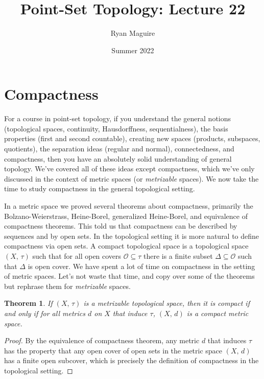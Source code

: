 \documentclass{article}
\title{Point-Set Topology: Lecture 22}
\author{Ryan Maguire}
\date{Summer 2022}
\theoremstyle{plain}
\newtheorem{theorem}{Theorem}[section]
\theoremstyle{normal}
\newenvironment{definition}{%
    \pushQED{\qed}\renewcommand{\qedsymbol}{$\blacksquare$}\definitionx%
}{%
    \popQED\enddefinitionx%
}
\begin{document}
    \maketitle
    \section{Compactness}
        For a course in point-set topology, if you understand the general
        notions (topological spaces, continuity, Hausdorffness, sequentialness),
        the basis properties (first and second countable), creating new spaces
        (products, subspaces, quotients), the separation ideas
        (regular and normal), connectedness, and compactness, then you have an
        absolutely solid understanding of general topology. We've covered all
        of these ideas except compactness, which we've only discussed in the
        context of metric spaces (or \textit{metrizable} spaces). We now take
        the time to study compactness in the general topological setting.
        \par\hfill\par
        In a metric space we proved several theorems about compactness,
        primarily the Bolzano-Weierstrass, Heine-Borel, generalized
        Heine-Borel, and equivalence of compactness theorems. This told us
        that compactness can be described by sequences and by open sets. In the
        topological setting it is more natural to define compactness via open
        sets.
        \begin{definition}[\textbf{Compact Topological Space}]
            A compact topological space is a topological space $(X,\,\tau)$
            such that for all open covers $\mathcal{O}\subseteq\tau$ there is
            a finite subset $\Delta\subseteq\mathcal{O}$ such that $\Delta$ is
            open cover.
        \end{definition}
        We have spent a lot of time on compactness in the setting of metric
        spaces. Let's not waste that time, and copy over some of the theorems
        but rephrase them for \textit{metrizable} spaces.
        \begin{theorem}
            If $(X,\,\tau)$ is a metrizable topological space, then it is
            compact if and only if for all metrics $d$ on $X$ that induce
            $\tau$, $(X,\,d)$ is a compact metric space.
        \end{theorem}
        \begin{proof}
            By the equivalence of compactness theorem, any metric $d$ that
            induces $\tau$ has the property that any open cover of open sets
            in the metric space $(X,\,d)$ has a finite open subcover, which is
            precisely the definition of compactness in the topological setting.
        \end{proof}
\end{document}
